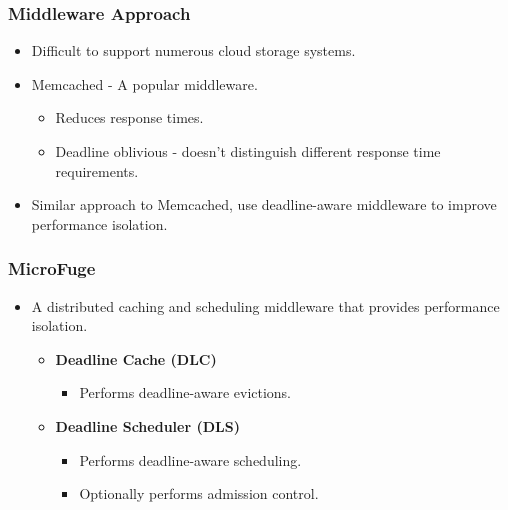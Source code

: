 \documentclass{beamer}
\newcommand{\myv}{\vspace{3 mm}}
\begin{document}
\begin{frame}
  \frametitle{Middleware Approach}
  \begin{itemize}
    \item Difficult to support numerous cloud storage systems.
      \myv
    \item Memcached - A popular middleware.
      \begin{itemize}
      \item Reduces response times.
      \item Deadline oblivious - doesn't distinguish different response time
        requirements.
      \end{itemize}
      \myv
    \item Similar approach to Memcached, use deadline-aware middleware to
      improve performance isolation.
  \end{itemize}
\end{frame}

\begin{frame}
  \frametitle{MicroFuge}
  \begin{itemize}
  \item A distributed caching and scheduling middleware that provides
    performance isolation.
    \myv
  \begin{itemize}
  \item \textbf{Deadline Cache (DLC)}
    \myv
      \begin{itemize}
      \item Performs deadline-aware evictions.
        \myv
      \end{itemize}
    \item \textbf{Deadline Scheduler (DLS)}
      \begin{itemize}
        \myv
      \item Performs deadline-aware scheduling.
        \myv
      \item {\textcolor[gray]{0.5} {Optionally performs admission control.}}
      \end{itemize}
  \end{itemize}
  \end{itemize}
\end{frame}

\end{document}
